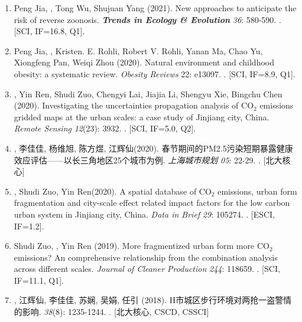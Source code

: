 \begin{enumerate}
\item
    Peng Jia\CS, \Shaoqing, Tong Wu, Shujuan Yang (2021).
    New approaches to anticipate the risk of reverse zoonosis.
    \textbf{\textit{Trends in Ecology \& Evolution}} \textit{36}: 580-590.
    . [SCI, IF=16.8, Q1].
\item
    Peng Jia\CS, \Shaoqing, Kristen. E. Rohli, Robert V. Rohli, Yanan Ma, Chao Yu, Xiongfeng Pan, Weiqi Zhou (2020).
    Natural environment and childhood obesity: a systematic review.
    \textit{Obesity Reviews} 22: e13097.
    . [SCI, IF=8.9, Q1].
\item
    \Shaoqing\CF, Yin Ren\CF, Shudi Zuo\CS, Chengyi Lai, Jiajia Li, Shengyu Xie, Bingchu Chen (2020).
    Investigating the uncertainties propagation analysis of CO$_2$ emissions gridded maps at the urban scales: a case study of Jinjiang city, China. 
    \textit{Remote Sensing} \textit{12}(23): 3932.
    . [SCI, IF=5.0, Q2].
\item
    {}, 李佳佳, 杨维旭, 陈方煜, 江辉仙\CS(2020).
    春节期间的PM2.5污染短期暴露健康效应评估——以长三角地区25个城市为例.
    \textit{上海城市规划} \textit{05}: 22-29.
    . [北大核心] 
\item
    \Shaoqing, Shudi Zuo, Yin Ren\CS (2020).
    A spatial database of CO$_2$ emissions, urban form fragmentation and city-scale effect related impact factors for the low carbon urban system in Jinjiang city, China.
    \textit{Data in Brief} \textit{29}: 105274.
    . [ESCI, IF=1.2].
\item
    Shudi Zuo, \Shaoqing, Yin Ren (2019).
    More fragmentized urban form more CO$_2$ emissions? An comprehensive relationship from the combination analysis across different scales.
    \textit{Journal of Cleaner Production} \textit{244}: 118659.
    . [SCI, IF=11.1, Q1].
\item
    {}, 江辉仙\CS, 李佳佳, 苏娴, 吴娟, 任引 (2018).
	H市城区步行环境对两抢一盗警情的影响.
    {}  \textit{38}(8): 1235-1244.
    . [北大核心, CSCD, CSSCI]
\end{enumerate}

